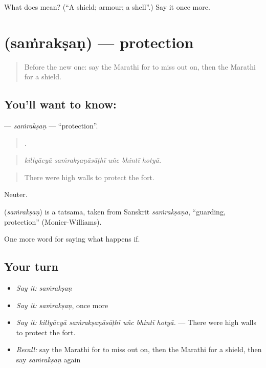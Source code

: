 \begin{tcolorbox}[breakable,colback=teal!4,colframe=teal!35!black,title={Before you move on}]
What does  mean? (\textquotedblleft{}A shield; armour; a shell\textquotedblright{}.) Say it once more.
\end{tcolorbox}
\section[\texorpdfstring{\mr{संरक्षण} (saṁrakṣaṇ)}{संरक्षण (saṁrakṣaṇ)}]{ (saṁrakṣaṇ) — protection}

\label{lesson:MR-C549-samraksan}



\begin{quote}
Before the new one: say the Marathi for to miss out on, then the Marathi for a shield.
\end{quote}

\subsection*{You'll want to know: }
\textbf{} — \emph{saṁrakṣaṇ} — \textquotedblleft{}protection\textquotedblright{}.

\begin{quote}
    .
\end{quote}

\begin{quote}
\emph{killyācyā saṁrakṣaṇāsāṭhī uñc bhintī hotyā.}
\end{quote}

\begin{quote}
There were high walls to protect the fort.
\end{quote}

Neuter.

\begin{cousinweb}
\textbf{} (\emph{saṁrakṣaṇ}) is a tatsama, taken from Sanskrit \emph{saṁrakṣaṇa}, \textquotedblleft{}guarding, protection\textquotedblright{} (Monier-Williams).
\end{cousinweb}

\begin{grammarlens}[title={What you've built}]
One more word for saying what happens if.
\end{grammarlens}

\subsection*{Your turn}
\begin{itemize}
\raggedright
  \item \emph{Say it:} \emph{saṁrakṣaṇ}
  \item \emph{Say it:} \emph{saṁrakṣaṇ}, once more
  \item \emph{Say it:} \emph{killyācyā saṁrakṣaṇāsāṭhī uñc bhintī hotyā.} — There were high walls to protect the fort.
  \item \emph{Recall:} say the Marathi for to miss out on, then the Marathi for a shield, then say \emph{saṁrakṣaṇ} again
\end{itemize}

